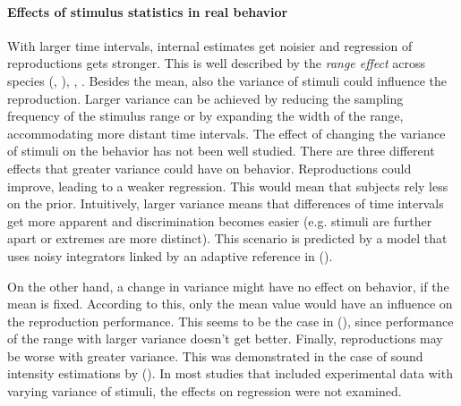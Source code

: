 \documentclass[10pt]{article}
\begin{document}
\paragraph{Effects of stimulus statistics in real behavior}
With larger time intervals, internal estimates get noisier and regression of reproductions gets stronger. This is well described by the \textit{range effect} across species (\cite{Cicchini2012}, \cite{Sohn2019}), \cite{Henke2021}, \cite{Henke2022}. 
Besides the mean, also the variance of stimuli could influence the reproduction.
Larger variance can be achieved by reducing the sampling frequency of the stimulus range or by expanding the width of the range, accommodating more distant time intervals. 
The effect of changing the variance of stimuli on the behavior has not been well studied.
There are three different effects that greater variance could have on behavior. 
Reproductions could improve, leading to a weaker regression. This would mean that subjects rely less on the prior. 
Intuitively, larger variance means that differences of time intervals get more apparent and discrimination becomes easier (e.g. stimuli are further apart or extremes are more distinct). 
This scenario is predicted by a model that uses noisy integrators linked by an adaptive reference in \citeauthor{Thurley2016} (\citeyear{Thurley2016}).

On the other hand, a change in variance might have no effect on behavior, if the mean is fixed. According to this, only the mean value would have an influence on the reproduction performance.
This seems to be the case in \citeauthor{Petzschner2012} (\citeyear{Petzschner2012}), since performance of the range with larger variance doesn't get better. 
Finally, reproductions may be worse with greater variance. This was demonstrated in the case of sound intensity estimations by \citeauthor{Teghtsoonian78} (\citeyear{Teghtsoonian78}).
In most studies that included experimental data with varying variance of stimuli, the effects on regression were not examined. 
\end{document}

